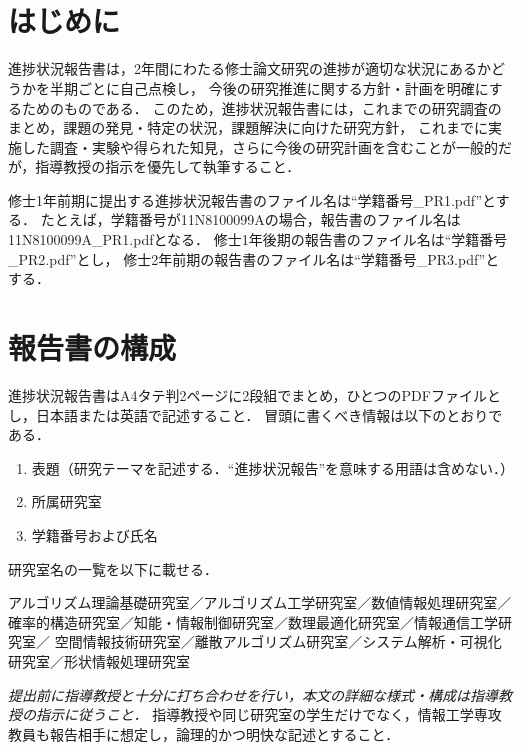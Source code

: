 \documentclass[uplatex,dvipdfmx,10pt,a4paper,notitlepage,oneside,twocolumn]{abst_jsarticle}
\title{
\textbf{\textgt{タイトル}}
}
\author{\begin{center}
{\large \textbf{\textgt{11N8101099A　草野 みどり}}}\\
{\large \textbf{\textgt{情報工学専攻　●●研究室}}}\\
{\large \textbf{\textgt{20XX年X月}}}
\end{center}}
\date{}
\begin{document}
\maketitle


\section{はじめに} \label{sec:intro}

進捗状況報告書は，2年間にわたる修士論文研究の進捗が適切な状況にあるかどうかを半期ごとに自己点検し，
今後の研究推進に関する方針・計画を明確にするためのものである．
このため，進捗状況報告書には，これまでの研究調査のまとめ，課題の発見・特定の状況，課題解決に向けた研究方針，
これまでに実施した調査・実験や得られた知見，さらに今後の研究計画を含むことが一般的だが，指導教授の指示を優先して執筆すること．

修士1年前期に提出する進捗状況報告書のファイル名は“学籍番号\_PR1.pdf”とする．
たとえば，学籍番号が11N8100099Aの場合，報告書のファイル名は11N8100099A\_PR1.pdfとなる．
修士1年後期の報告書のファイル名は“学籍番号\_PR2.pdf”とし，
修士2年前期の報告書のファイル名は“学籍番号\_PR3.pdf”とする．



\section{報告書の構成}

進捗状況報告書はA4タテ判2ページに2段組でまとめ，ひとつのPDFファイルとし，日本語または英語で記述すること．
冒頭に書くべき情報は以下のとおりである．
\begin{enumerate}
\item 表題（研究テーマを記述する．“進捗状況報告”を意味する用語は含めない．）
\item 所属研究室
\item 学籍番号および氏名
\end{enumerate}
研究室名の一覧を以下に載せる．

\smallskip

\noindent
アルゴリズム理論基礎研究室／アルゴリズム工学研究室／数値情報処理研究室／
確率的構造研究室／知能・情報制御研究室／数理最適化研究室／情報通信工学研究室／
空間情報技術研究室／離散アルゴリズム研究室／システム解析・可視化研究室／形状情報処理研究室

\smallskip


{\em 提出前に指導教授と十分に打ち合わせを行い，本文の詳細な様式・構成は指導教授の指示に従うこと．}
指導教授や同じ研究室の学生だけでなく，情報工学専攻教員も報告相手に想定し，論理的かつ明快な記述とすること．
\end{document}
